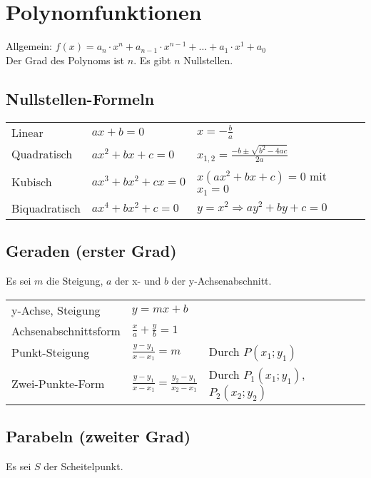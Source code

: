 \section{Polynomfunktionen}
Allgemein: $f(x) = a_n \cdot x^n + a_{n-1} \cdot x^{n-1} + \dots + a_1 \cdot x^1 + a_0$\\
Der Grad des Polynoms ist $n$. Es gibt $n$ Nullstellen.

\subsection{Nullstellen-Formeln}
\settowidth{\MyLenA}{Biquadratisch~~}
\settowidth{\MyLenB}{$ax^3 + bx^2 + cx = 0$~~}
\begin{tabular}{@{}p{\the\MyLenA}%
				@{}p{\the\MyLenB}
				@{}p{\linewidth - \the\MyLenA - \the\MyLenB}}
Linear & $ax + b = 0$ & $x = - \frac{b}{a}$\\
Quadratisch & $ax^2 + bx + c = 0$ & $x_{1,2} = \frac{-b \pm \sqrt{b^{2} - 4ac}}{2a}$\\
Kubisch & $ax^3 + bx^2 + cx = 0$ & $x(ax^2 + bx + c) = 0$ mit $x_1 = 0$\\ 
Biquadratisch & $ax^4 + bx^2 + c = 0$ & $y = x^2 \Rightarrow ay^2 + by + c = 0$\\ 
\end{tabular}

\subsection{Geraden (erster Grad)}
Es sei $m$ die Steigung, $a$ der x- und $b$ der y-Achsenabschnitt. 
\settowidth{\MyLenA}{Achsenabschnittsform~~}
\begin{tabular}{@{}p{\the\MyLenA}%
				@{}p{\the\MyLenB}
				@{}p{\linewidth - \the\MyLenA - \the\MyLenB}}
y-Achse, Steigung & $y = mx + b$ & \\
Achsenabschnittsform & $\frac{x}{a} + \frac{y}{b} = 1$ & \\
Punkt-Steigung & $\frac{y - y_1}{x - x_1} = m$ & Durch $P(x_1;y_1)$\\
Zwei-Punkte-Form & $\frac{y - y_1}{x - x_1} = \frac{y_2 - y_1}{x_2 - x_1}$ & Durch $P_1(x_1;y_1)$, $P_2(x_2;y_2)$\\
\end{tabular}

\subsection{Parabeln (zweiter Grad)}
Es sei $S$ der Scheitelpunkt.

